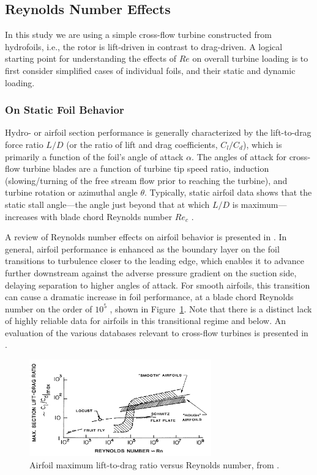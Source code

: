 \documentclass[energies,article,accept,moreauthors,pdftex,12pt,a4paper]{mdpi}
\begin{document}
\subsection{Reynolds Number Effects}

In this study we are using a simple cross-flow turbine constructed from
hydrofoils, i.e., the rotor is lift-driven in contrast to drag-driven. A logical
starting point for understanding the effects of $Re$ on overall turbine loading
is to first consider simplified cases of individual foils, and their static and
dynamic loading.


\subsubsection{On Static Foil Behavior}

Hydro- or airfoil section performance is generally characterized by the
lift-to-drag force ratio $L/D$ (or the ratio of lift and drag coefficients,
$C_l/C_d$), which is primarily a function of the foil's angle of attack
$\alpha$. The angles of attack for cross-flow turbine blades are a function of
turbine tip speed ratio, induction (slowing/turning of the free stream flow
prior to reaching the turbine), and turbine rotation or azimuthal angle
$\theta$. Typically, static airfoil data shows that the static stall
angle---the angle just beyond that at which $L/D$ is maximum---increases with
blade chord Reynolds number $Re_c$ \cite{Jacobs1937}.

A review of Reynolds number effects on airfoil behavior is presented in
\cite{Lissaman1983}. In general, airfoil performance is enhanced as the boundary
layer on the foil transitions to turbulence closer to the leading edge, which
enables it to advance further downstream against the adverse pressure gradient
on the suction side, delaying separation to higher angles of attack. For smooth
airfoils, this transition can cause a dramatic increase in foil performance, at
a blade chord Reynolds number on the order of $10^5$ \cite{McMasters1980}, shown
in Figure~\ref{fig:McMasters}. Note that there is a distinct lack of highly
reliable data for airfoils in this transitional regime and below. An evaluation
of the various databases relevant to cross-flow turbines is presented in
\cite{Bedon2014}.


\begin{figure}[ht]
\centering

\includegraphics[width=0.7\textwidth]{figures/McMasters-Henderson-1980}

\caption{Airfoil maximum lift-to-drag ratio versus Reynolds number, from
    \cite{McMasters1980}.}

\label{fig:McMasters}
\end{figure}
\end{document}
